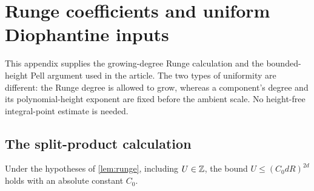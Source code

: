 \section{Runge coefficients and uniform Diophantine inputs}\label{supp:sec:diophantine}
This appendix supplies the growing-degree Runge calculation and the
bounded-height Pell argument used in the article. The two types of
uniformity are different: the Runge degree is allowed to grow, whereas a
component's degree and its polynomial-height exponent are fixed before
the ambient scale. No height-free integral-point estimate is needed.

\subsection{The split-product calculation}
\begin{lemma}\label{supp:lem:runge-calculation}
Under the hypotheses of \cref{lem:runge}, including $U\in\mathbb Z$, the bound
$U\le(C_0dR)^{2d}$ holds with an absolute constant $C_0$.
\end{lemma}
